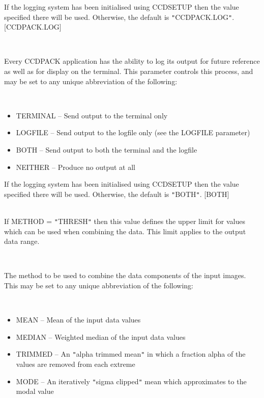 \documentclass[twoside,11pt]{article}
\newcommand{\htmlref}[2]{#1}
\renewcommand{\_}{\texttt{\symbol{95}}}
\newcommand{\qt}[1]{{\tt "}#1{\tt "}}
\newcommand{\xroutine}[1]{\htmlref{{\sc #1}}{#1}}
\newcommand{\sstsubsection}[1]{ \item[{#1}] \mbox{} \\}
\newcommand{\sstitemlist}[1]{
  \mbox{} \\
  \vspace{-3.5ex}
  \begin{itemize}
     #1
  \end{itemize}
}
\newcommand{\sstitem}{\item}
\newcommand{\sstsubsection}[1]{\item[{#1}]}
\newcommand{\sstitemlist}[1]{
      \begin{itemize}
         #1
      \end{itemize}
      \\
   }
\newcommand{\sstitem}{\item}
\begin{document}
{{{         If the logging system has been initialised using \xroutine{CCDSETUP}
         then the value specified there will be used. Otherwise, the
         default is \qt{CCDPACK.LOG}.
         [CCDPACK.LOG]
      }
      \sstsubsection{
         LOGTO = LITERAL (Read)
      } {
         Every CCDPACK application has the ability to log its output
         for future reference as well as for display on the terminal.
         This parameter controls this process, and may be set to any
         unique abbreviation of the following:
         \sstitemlist{

            \sstitem
               TERMINAL  -- Send output to the terminal only

            \sstitem
               LOGFILE   -- Send output to the logfile only (see the
                               LOGFILE parameter)

            \sstitem
               BOTH      -- Send output to both the terminal and the
                               logfile

            \sstitem
               NEITHER   -- Produce no output at all

         }
         If the logging system has been initialised using \xroutine{CCDSETUP}
         then the value specified there will be used. Otherwise, the
         default is \qt{BOTH}.
         [BOTH]
      }
      \sstsubsection{
         MAX = \_REAL (Read)
      } {
         If METHOD = \qt{THRESH} then this value defines the upper limit
         for values which can be used when combining the data. This
         limit applies to the output data range.
      }
      \sstsubsection{
         METHOD = LITERAL (Read)
      } {
         The method to be used to combine the data components of
         the input images. This may be set to any unique abbreviation of
         the following:
         \sstitemlist{

            \sstitem
               MEAN      -- Mean of the input data values

            \sstitem
               MEDIAN    -- Weighted median of the input data values

            \sstitem
               TRIMMED   -- An \qt{alpha trimmed mean} in which a fraction
                               alpha of the values are removed from
                               each extreme

            \sstitem
               MODE      -- An iteratively \qt{sigma clipped} mean which
                               approximates to the modal value

}}}}
\end{document}
